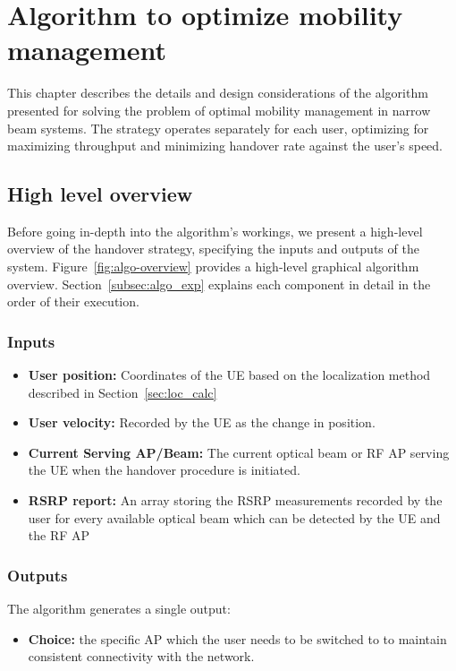 \chapter{Algorithm to optimize mobility management}
\label{chp:problem_statement}

This chapter describes the details and design considerations of the algorithm presented for solving the problem of optimal mobility management in narrow beam systems. The strategy operates separately for each user, optimizing for maximizing throughput and minimizing handover rate against the user's speed.
\section{High level overview}
Before going in-depth into the algorithm's workings, we present a high-level overview of the handover strategy, specifying the inputs and outputs of the system. Figure~\ref{fig:algo-overview} provides a high-level graphical algorithm overview. Section~\ref{subsec:algo_exp} explains each component in detail in the order of their execution.
\subsection{Inputs}
\label{subsec:algo-input}
\begin{itemize}
    \item \textbf{User position:} Coordinates of the UE based on the localization method described in Section~\ref{sec:loc_calc}
    \item \textbf{User velocity:} Recorded by the UE as the change in position. 
    \item \textbf{Current Serving AP/Beam:} The current optical beam or RF AP serving the UE when the handover procedure is initiated.
    \item \textbf{RSRP report:} An array storing the RSRP measurements recorded by the user for every available optical beam which can be detected by the UE and the RF AP
\end{itemize}
\subsection{Outputs}
The algorithm generates a single output:
\begin{itemize}
    \item \textbf{Choice:} the specific AP which the user needs to be switched to to maintain consistent connectivity with the network.
\end{itemize}

